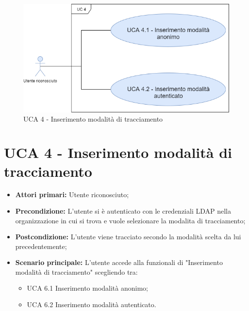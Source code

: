 \newpage
\begin{figure}[h]
	\centering
	\caption{UCA 4 - Inserimento modalità di tracciamento}
	\includegraphics[scale=0.53]{sezioni/UseCase/Immagini/UCA4.png}
\end{figure}
\section{UCA 4 - Inserimento modalità di tracciamento}%
\begin{itemize}
	\item \textbf{Attori primari:} Utente riconosciuto;
	\item \textbf{Precondizione:} L'utente si è autenticato con le credenziali LDAP nella organizzazione in cui si trova e vuole selezionare la modalita di tracciamento;
	\item \textbf{Postcondizione:} L'utente viene tracciato secondo la modalità scelta da lui precedentemente; 
	\item \textbf{Scenario principale:} L'utente accede alla funzionali di "Inserimento modalità di tracciamento" scegliendo tra:
	\begin{itemize}
		\item UCA 6.1 Inserimento modalità anonimo;
		\item UCA 6.2 Inserimento modalità autenticato.
	\end{itemize}
\end{itemize}

